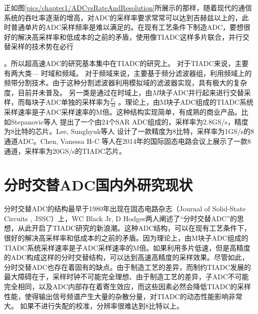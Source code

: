 	正如图\ref {pics/chapter1/ADCvsRateAndResolution}所展示的那样，随着现代的通信系统的吞吐率逐渐的增高，对ADC的采样率要求常常可以达到吉赫兹以上的，此时普通单片的ADC采样频率是难以满足的。在现有工艺条件下制造ADC，要想很好的解决高采样率和低成本的之前的矛盾，使用像TIADC这样多片联合，并行交替采样的技术势在必行\cite{black1980time}\par。所以超高速ADC的研究基本集中在TIADC的研究上。
	对于TIADC来说，主要有两大类--- 时域和频域。
	对于频域来说，主要基于频分滤波器组，利用频域上的频带分割技术。由于这种分割滤波器利用模拟域的滤波器实现，具有极大的复杂度，目前并未普及。
	另一类是通过在时域上，由$M$块子ADC并行起来进行交替采样，而每块子ADC单独的采样率为$\frac{F_s}{M}$
	。理论上，由M块子ADC组成的TIADC系统采样速率是子ADC采样速率的M倍。这种结构实现简单，有成熟的商业产品。比如Stepanovic等人\cite{stepanovic20132} 提出了一个由24个SAR ADC组成的，采样率为2.8GS/s，精度为8比特的芯片。Lee, Sunghyuk等人\cite {lee20141} 设计了一款精度为8比特，采样率为1GS/s的8通道ADC。Chen, Vanessa H-C \cite {chen201469}等人在2014年的国际固态电路会议上展示了一款8通道，采样率为20GS/s的TIADC芯片。
	
\section {分时交替ADC国内外研究现状}
	
	分时交替ADC的结构最早于1980年出现在固态电路杂志（Journal of Solid-State Circuits , JSSC）上，WC Black Jr, D Hodges两人阐述了“分时交替ADC”的思想\cite{black1980time}，从此开启了TIADC研究的新浪潮。这种ADC结构，可以在现有工艺条件下，很好的解决高采样率和低成本的之前的矛盾。因为理论上，由M块子ADC组成的TIADC系统采样速率是子ADC采样速率的M倍。如果利用多片低速，但是高精度的ADC构成这样的分时交替结构，可以达到高速高精度的采样效果。尽管如此，分时交替ADC也存在着固有的缺点。由于制造工艺的差异，而制约TIADC发展的最大障碍在于，采样时钟不可能完全理想、由于制造工艺的差异，子ADC不可能完全相同，以及ADC内部存在着寄生效应，而这些因素必然会降低TIADC的采样性能，使得输出信号频谱产生大量的杂散分量，对TIADC的动态性能影响非常大。 如果不进行失配的校准，分辨率很难达到8比特以上。\par
	
